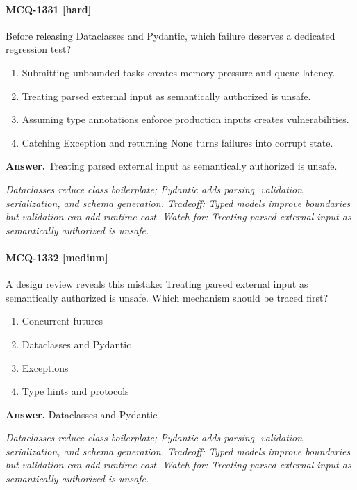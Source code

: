 \paragraph{MCQ-1331 [hard]} Before releasing Dataclasses and Pydantic, which failure deserves a dedicated regression test?
\begin{enumerate}[label=\Alph*.]
\item Submitting unbounded tasks creates memory pressure and queue latency.
\item Treating parsed external input as semantically authorized is unsafe.
\item Assuming type annotations enforce production inputs creates vulnerabilities.
\item Catching Exception and returning None turns failures into corrupt state.
\end{enumerate}
\noindent\textbf{Answer.} Treating parsed external input as semantically authorized is unsafe.
\par\textit{Dataclasses reduce class boilerplate; Pydantic adds parsing, validation, serialization, and schema generation. Tradeoff: Typed models improve boundaries but validation can add runtime cost. Watch for: Treating parsed external input as semantically authorized is unsafe.}
\paragraph{MCQ-1332 [medium]} A design review reveals this mistake: Treating parsed external input as semantically authorized is unsafe. Which mechanism should be traced first?
\begin{enumerate}[label=\Alph*.]
\item Concurrent futures
\item Dataclasses and Pydantic
\item Exceptions
\item Type hints and protocols
\end{enumerate}
\noindent\textbf{Answer.} Dataclasses and Pydantic
\par\textit{Dataclasses reduce class boilerplate; Pydantic adds parsing, validation, serialization, and schema generation. Tradeoff: Typed models improve boundaries but validation can add runtime cost. Watch for: Treating parsed external input as semantically authorized is unsafe.}

